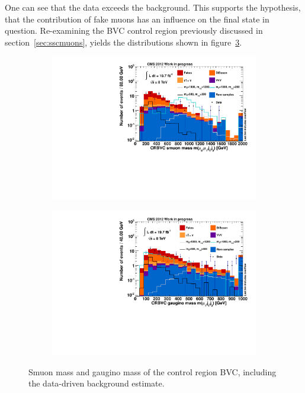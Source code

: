 One can see that the data exceeds the background. This supports the hypothesis, that the contribution of fake muons has an influence on the final state in question. Re-examining the BVC control region previously discussed in section~\ref{sec:sscmuons}, yields the distributions shown in figure~\ref{fig:CRBVC}.

\begin{figure}[hb!]
  \centering
  \begin{subfigure}[b]{0.495\textwidth}
    \centering
    \includegraphics[width=\textwidth]{plots/CR6_m_smuon.pdf}
    \caption{\label{fig:CRBVC_m_smuon}}
  \end{subfigure}
  \begin{subfigure}[b]{0.495\textwidth}
    \centering
    \includegraphics[width=\textwidth]{plots/CR6_m_gaugino.pdf}
    \caption{\label{fig:CRBVC_m_gaugino}}
  \end{subfigure}

  \caption{Smuon mass and gaugino mass of the control region BVC, including the data-driven background estimate.}
  \label{fig:CRBVC}
\end{figure}

